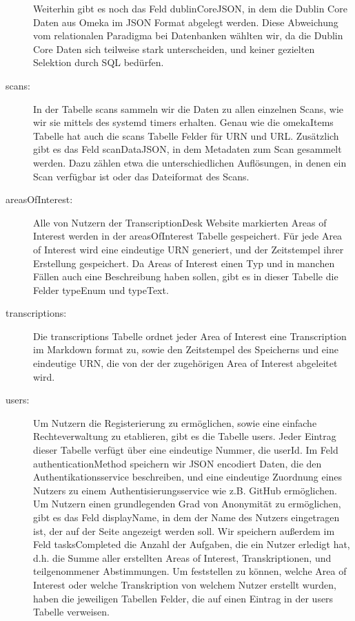 \documentclass{article}
\begin{document}
\begin{description}
    Weiterhin gibt es noch das Feld dublinCoreJSON,
    in dem die Dublin Core Daten aus Omeka im JSON Format abgelegt werden.
    Diese Abweichung vom relationalen Paradigma bei Datenbanken wählten wir,
    da die Dublin Core Daten sich teilweise stark unterscheiden,
    und keiner gezielten Selektion durch SQL bedürfen.
\item[scans:]
    In der Tabelle scans sammeln wir die Daten zu allen einzelnen Scans,
    wie wir sie mittels des systemd timers erhalten.
    Genau wie die omekaItems Tabelle hat auch die scans Tabelle Felder für URN und URL.
    Zusätzlich gibt es das Feld scanDataJSON,
    in dem Metadaten zum Scan gesammelt werden.
    Dazu zählen etwa die unterschiedlichen Auflösungen,
    in denen ein Scan verfügbar ist
    oder das Dateiformat des Scans.
\item[areasOfInterest:]
    Alle von Nutzern der TranscriptionDesk Website markierten Areas of Interest werden in der areasOfInterest Tabelle gespeichert.
    Für jede Area of Interest wird eine eindeutige URN generiert,
    und der Zeitstempel ihrer Erstellung gespeichert.
    Da Areas of Interest einen Typ und in manchen Fällen auch eine Beschreibung haben sollen,
    gibt es in dieser Tabelle die Felder typeEnum und typeText.
\item[transcriptions:]
    Die transcriptions Tabelle ordnet jeder Area of Interest eine Transcription im Markdown format zu,
    sowie den Zeitstempel des Speicherns und eine eindeutige URN, die von der der zugehörigen Area of Interest abgeleitet wird.
\item[users:]
    Um Nutzern die Registerierung zu ermöglichen,
    sowie eine einfache Rechteverwaltung zu etablieren,
    gibt es die Tabelle users.
    Jeder Eintrag dieser Tabelle verfügt über eine eindeutige Nummer, die userId.
    Im Feld authenticationMethod speichern wir JSON encodiert Daten,
    die den Authentikationsservice beschreiben,
    und eine eindeutige Zuordnung eines Nutzers zu einem Authentisierungsservice wie z.B. GitHub ermöglichen.
    Um Nutzern einen grundlegenden Grad von Anonymität zu ermöglichen,
    gibt es das Feld displayName,
    in dem der Name des Nutzers eingetragen ist,
    der auf der Seite angezeigt werden soll.
    Wir speichern außerdem im Feld tasksCompleted
    die Anzahl der Aufgaben, die ein Nutzer erledigt hat,
    d.h. die Summe aller erstellten Areas of Interest, Transkriptionen,
    und teilgenommener Abstimmungen.
    Um feststellen zu können, welche Area of Interest oder welche Transkription
    von welchem Nutzer erstellt wurden,
    haben die jeweiligen Tabellen Felder,
    die auf einen Eintrag in der users Tabelle verweisen.
\end{description}
\end{document}
